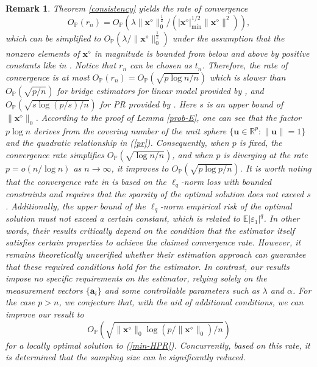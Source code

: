 \documentclass{article}
\newtheorem{remark}{Remark}
\numberwithin{equation}{section}
\begin{document}
	
\begin{remark}\label{explanation-con-rate}  	  Theorem \ref{consistency} yields the rate of convergence $$O_{\mathbb{P}}(r_n)=O_{\mathbb{P}}(\lambda\|\mathbf{x}^\diamond\|_0^{\frac{1}{2}}/(|\mathbf{x}^\diamond|_{\mathrm{min}}^{1/2}\|\mathbf{x}^\diamond\|^2)),$$ which can be simplified to $O_{\mathbb{P}}(\lambda/\|\mathbf{x}^\diamond\|_0^{\frac{1}{2}})$ under the assumption that the nonzero elements of $\mathbf{x}^\diamond$ in magnitude is bounded from below and above by positive constants like in \cite{huang2008asymptotic}. Notice that $r_n$ can be chosen as $t_n$. Therefore, the rate of convergence is at most $O_{\mathbb{P}}(r_n)=O_{\mathbb{P}}(\sqrt{p\log n/n})$ which is slower than $O_{\mathbb{P}}(\sqrt{p/n})$ for  bridge estimators for linear model provided by \cite{huang2008asymptotic}, and $O_{\mathbb{P}}(\sqrt{s\log (p/s)/n})$ for PR provided by  \cite{eldar2014phase}. Here $s$ is an upper bound of $\|\mathbf{x}^\diamond\|_0$. According to the proof of Lemma \ref{prob-E}, one can see that the factor $p\log n$ derives from the covering number of the unit sphere $\{\mathbf{u}\in\mathbb{R}^p: \|\mathbf{u}\|=1\}$ and the quadratic relationship in (\ref{pr}). Consequently, when $p$ is fixed,  the convergence rate simplifies  $O_{\mathbb{P}}(\sqrt{\log n /n})$, and when $p$ is diverging at the rate  $p=o(n/\log n)$ as $n\to\infty$, it improves to $O_{\mathbb{P}}(\sqrt{p\log p/n})$. 
 It is worth noting that the convergence rate in \cite{eldar2014phase}  is based on the $\ell_q$-norm loss with bounded constraints and requires that the sparsity of the optimal solution does not exceed $s$. Additionally, the upper bound of the $\ell_q$-norm empirical risk of the optimal solution must not exceed a certain constant, which is related to
			$\mathbb{E}|\varepsilon_1|^q$. In other words, their results critically depend on the condition that the estimator itself satisfies certain properties to achieve the claimed convergence rate. However, it remains theoretically unverified whether their estimation approach can guarantee that these required conditions hold for the estimator. In contrast, our results impose no specific requirements on the estimator, relying solely on the measurement vectors $\{\mathbf{a}_i\}$ and some controllable parameters such as $\lambda$ and $\alpha$. For the case $p>n$, we conjecture that, with the aid of additional conditions, we can improve our result to $$O_{\mathbb{P}}(\sqrt{\|\mathbf{x}^\diamond\|_0\log (p/\|\mathbf{x}^\diamond\|_0)/n})$$ for a locally optimal solution to (\ref{min-HPR}). Concurrently, based on  this rate, it is determined that the sampling size can be significantly reduced.\end{remark}
\end{document}
